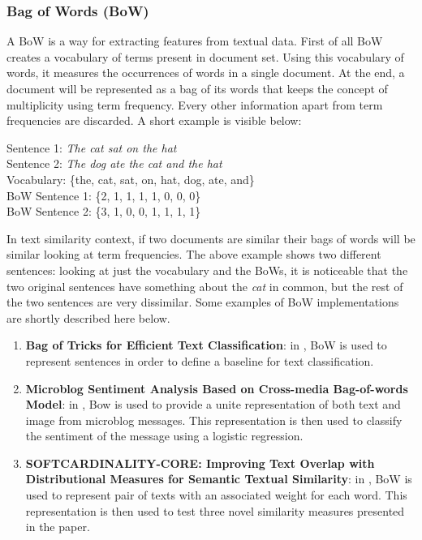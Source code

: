\documentclass[\main/main.tex]{subfiles}
\begin{document}
\subsubsection{Bag of Words (BoW)}
A BoW is a way for extracting features from textual data. First of all BoW creates a vocabulary of terms present in document set. Using this vocabulary of words, it measures the occurrences of words in a single document. At the end, a document will be represented as a bag of its words that keeps the concept of multiplicity using term frequency. Every other information apart from term frequencies are discarded.
A short example is visible below:
\begin{center}
    Sentence 1: \emph{The cat sat on the hat}\\
    Sentence 2: \emph{The dog ate the cat and the hat}\\
    Vocabulary: \{the, cat, sat, on, hat, dog, ate, and\}\\
    BoW Sentence 1: \{2, 1, 1, 1, 1, 0, 0, 0\}\\
    BoW Sentence 2: \{3, 1, 0, 0, 1, 1, 1, 1\}
\end{center}
In text similarity context, if two documents are similar their bags of words will be similar looking at term frequencies. The above example shows two different sentences: looking at just the vocabulary and the BoWs, it is noticeable that the two original sentences have something about the \emph{cat} in common, but the rest of the two sentences are very dissimilar. Some examples of BoW implementations are shortly described here below.
\begin{enumerate}
    \item \textbf{Bag of Tricks for Efficient Text Classification}: in \cite{Joulin2017BagOT}, BoW is used to represent sentences in order to define a baseline for text classification.
    \item \textbf{Microblog Sentiment Analysis Based on Cross-media Bag-of-words Model}: in \cite{Wang2014MicroblogSA}, Bow is used to provide a unite representation of both text and image from microblog messages. This representation is then used to classify the sentiment of the message using a logistic regression.
    \item \textbf{SOFTCARDINALITY-CORE: Improving Text Overlap with Distributional Measures for Semantic Textual Similarity}: in \cite{Jimnez2013SOFTCARDINALITYCOREIT}, BoW is used to represent pair of texts with an associated weight for each word. This representation is then used to test three novel similarity measures presented in the paper.
\end{enumerate}
\end{document}
